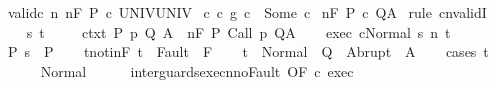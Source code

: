 \begin{isabellebody}
\ valid{\isacharunderscore}c{}{\isacharcolon}\ {\isachardoublequoteopen}{\isasymforall}n{\isachardot}\ {\isasymGamma}{\isacharcomma}{\isasymTheta}{\isasymTurnstile}n{\isacharcolon}\isactrlbsub {\isacharslash}F\isactrlesub \ P\ c\ UNIV{\isacharcomma}UNIV{\isachardoublequoteclose}\isanewline
{}\ c{\isacharcolon}\ {\isachardoublequoteopen}{\isacharparenleft}c\ {\isasyminter}\isactrlsub g\ c\ {\isacharequal}\ Some\ c{\isachardoublequoteclose}\isanewline
{}\ {\isachardoublequoteopen}{\isasymGamma}{\isacharcomma}{\isasymTheta}{\isasymTurnstile}n{\isacharcolon}\isactrlbsub {\isacharslash}F\isactrlesub \ P\ c\ Q{\isacharcomma}A{\isachardoublequoteclose}\isanewline
%
\isadelimproof
%
\endisadelimproof
%
\isatagproof
{}\isamarkupfalse%
\ {\isacharparenleft}rule\ cnvalidI{\isacharparenright}\isanewline
\ \ \isamarkupfalse%
\ s\ t\ \isanewline
\ \ \isamarkupfalse%
\ ctxt{\isacharcolon}\ {\isachardoublequoteopen}{\isasymforall}{\isacharparenleft}P{\isacharcomma}\ p{\isacharcomma}\ Q{\isacharcomma}\ A{\isacharparenright}{\isasymin}{\isasymTheta}{\isachardot}\ {\isasymGamma}\ {\isasymTurnstile}n{\isacharcolon}\isactrlbsub {\isacharslash}F\isactrlesub \ P\ {\isacharparenleft}Call\ p{\isacharparenright}\ Q{\isacharcomma}A{\isachardoublequoteclose}\isanewline
\ \ \isamarkupfalse%
\ exec{\isacharcolon}\ {\isachardoublequoteopen}{\isasymGamma}{\isasymturnstile}{\isasymlangle}c{\isacharcomma}Normal\ s{\isasymrangle}\ {\isacharequal}n{\isasymRightarrow}\ t{\isachardoublequoteclose}\ \isanewline
\ \ \isamarkupfalse%
\ P{\isacharcolon}\ {\isachardoublequoteopen}s\ {\isasymin}\ P{\isachardoublequoteclose}\isanewline
\ \ \isamarkupfalse%
\ t{\isacharunderscore}notin{\isacharunderscore}F{\isacharcolon}\ {\isachardoublequoteopen}t\ {\isasymnotin}\ Fault\ {\isacharbackquote}\ F{\isachardoublequoteclose}\isanewline
\ \ \isamarkupfalse%
\ {\isachardoublequoteopen}t\ {\isasymin}\ Normal\ {\isacharbackquote}\ Q\ {\isasymunion}\ Abrupt\ {\isacharbackquote}\ A{\isachardoublequoteclose}\isanewline
\ \ \isamarkupfalse%
\ {\isacharparenleft}cases\ t{\isacharparenright}\isanewline
\ \ \ \ \isamarkupfalse%
\ Normal\isanewline
\ \ \ \ \isamarkupfalse%
\ inter{\isacharunderscore}guards{\isacharunderscore}execn{\isacharunderscore}noFault\ {\isacharbrackleft}OF\ c\ exec{\isacharbrackright}\isanewline

\end{isabellebody}

